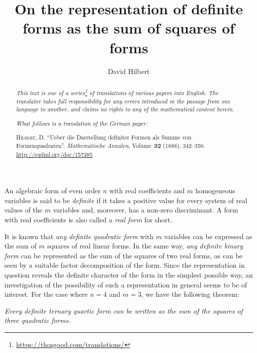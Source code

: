 \documentclass{article}
\title{On the representation of definite forms as the sum of squares of forms}
\author{David Hilbert}
\date{}
\newcommand{\oldpage}[1]{\marginpar{\footnotesize$\Big\vert$ \textit{p.~#1}}}
\begin{document}
\maketitle
\thispagestyle{fancy}

\renewcommand{\abstractname}{Translator's note.}

\begin{abstract}
  \renewcommand*{\thefootnote}{\fnsymbol{footnote}}
  \emph{This text is one of a series\footnote{\url{https://thosgood.com/translations/}} of translations of various papers into English.}
  \emph{The translator takes full responsibility for any errors introduced in the passage from one language to another, and claims no rights to any of the mathematical content herein.}

  \medskip
  
  \emph{What follows is a translation of the German paper:}

  \medskip\noindent
  \textsc{Hilbert, D.}
  ``Ueber die Darstellung definiter Formen als Summe von Formenquadraten''.
  \emph{Mathematische Annalen}, Volume~\textbf{32} (1888), 342--350.
  {\footnotesize\url{http://eudml.org/doc/157385}}
\end{abstract}

\setcounter{footnote}{0}
\renewcommand{\thefootnote}{\fnsymbol{footnote}}



\oldpage{342}

An algebraic form of even order $n$ with real coefficients and $m$ homogeneous variables is said to be \emph{definite} if it takes a positive value for every system of real values of the $m$ variables and, moreover, has a non-zero discriminant.
A form with real coefficients is also called a \emph{real form} for short.

It is known that \emph{any definite quadratic form} with $m$ variables can be expressed as the sum of $m$ squares of real linear forms.
In the same way, \emph{any definite binary form} can be represented as the sum of the squares of two real forms, as can be seen by a suitable factor decomposition of the form.
Since the representation in question reveals the definite character of the form in the simplest possible way, an investigation of the possibility of such a representation in general seems to be of interest.
For the case where $n=4$ and $m=3$, we have the following theorem:

\emph{Every definite ternary quartic form can be written as the sum of the squares of three quadratic forms.}
\end{document}
